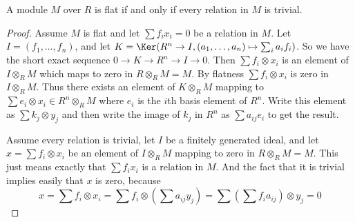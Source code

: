\begin{lemma}
\label{lemma-flat-eq}
A module $M$ over $R$ is flat if and only if
every relation in $M$ is trivial.
\end{lemma}

\begin{proof}
Assume $M$ is flat and let $\sum f_i x_i = 0$ be a relation in $M$.
Let $I = (f_1, \ldots, f_n)$, and let
$K = \Ker(R^n \to I, (a_1, \ldots, a_n) \mapsto \sum_i a_i f_i)$.
So we have the short exact sequence
$0 \to K \to R^n \to I \to 0$. Then $\sum f_i \otimes x_i$
is an element of $I \otimes_R M$ which maps
to zero in $R \otimes_R M = M$. By flatness
$\sum f_i \otimes x_i$ is zero in $I \otimes_R M$.
Thus there exists an element of $K \otimes_R M$ mapping
to $\sum e_i \otimes x_i \in R^n \otimes_R M$ where $e_i$
is the $i$th basis element of $R^n$.
Write this element as $\sum k_j \otimes y_j$
and then write the image of $k_j$ in $R^n$ as
$\sum a_{ij} e_i$ to get the result.

\medskip\noindent
Assume every relation is trivial, let $I$
be a finitely generated ideal, and let $x = \sum f_i \otimes x_i$
be an element of $I \otimes_R M$ mapping to zero in $R \otimes_R M = M$.
This just means exactly that $\sum f_i x_i$ is a relation in
$M$. And the fact that it is trivial implies easily that
$x$ is zero, because
$$
x
=
\sum f_i \otimes x_i
=
\sum f_i \otimes \left(\sum a_{ij}y_j\right)
=
\sum \left(\sum f_i a_{ij}\right) \otimes y_j
=
0
$$
\end{proof}
